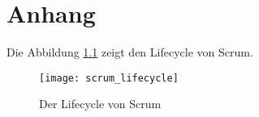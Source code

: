 \chapter{Anhang}

Die Abbildung \ref{fig:scrum_lifecycle} zeigt den Lifecycle von Scrum.

\begin{figure}[H]
	\centering
	\texttt{[image: scrum\_lifecycle]}
	\caption{Der Lifecycle von Scrum \cite{agileLifecycle}}
	\label{fig:scrum_lifecycle}
\end{figure}
